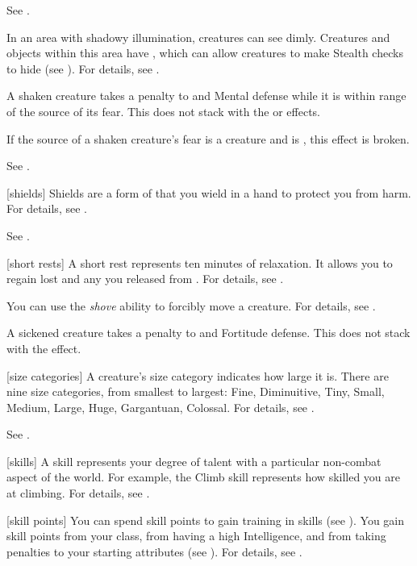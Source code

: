  See .

 In an area with shadowy illumination, creatures can see dimly.
Creatures and objects within this area have \concealment, which can allow creatures to make Stealth checks to hide (see ).
For details, see .

 A shaken creature takes a  penalty to  and Mental defense while it is within \rngclose range of the source of its fear.
This does not stack with the  or  effects.

If the source of a shaken creature's fear is a creature and is , this effect is broken.

 See .

[shields] Shields are a form of  that you wield in a hand to protect you from harm.
For details, see .

 See .

[short rests] A short rest represents ten minutes of relaxation.
It allows you to regain lost  and any  you released from .
For details, see .

 You can use the \textit{shove} ability to forcibly move a creature.
For details, see .

 A sickened creature takes a  penalty to  and Fortitude defense.
This does not stack with the  effect.

[size categories] A creature's size category indicates how large it is.
There are nine size categories, from smallest to largest: Fine, Diminuitive, Tiny, Small, Medium, Large, Huge, Gargantuan, Colossal.
For details, see .

 See .

[skills] A skill represents your degree of talent with a particular non-combat aspect of the world.
For example, the Climb skill represents how skilled you are at climbing.
For details, see .

[skill points] You can spend skill points to gain training in skills (see ).
You gain skill points from your class, from having a high Intelligence, and from taking penalties to your starting attributes (see ).
For details, see .

